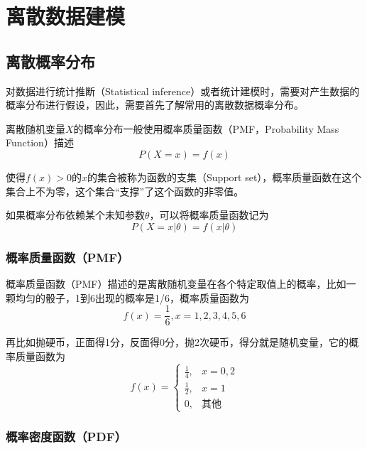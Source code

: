\section{离散数据建模}

\subsection{离散概率分布}

对数据进行统计推断（Statistical inference）或者统计建模时，需要对产生数据的概率分布进行假设，因此，需要首先了解常用的离散数据概率分布。

离散随机变量$X$的概率分布一般使用概率质量函数（PMF，Probability Mass Function）描述
\begin{equation}
    P(X = x) = f(x)
\end{equation}

使得$f(x)>0$的$x$的集合被称为函数的支集（Support set），概率质量函数在这个集合上不为零，这个集合“支撑”了这个函数的非零值。

如果概率分布依赖某个未知参数$\theta$，可以将概率质量函数记为
\begin{equation}
    P(X = x | \theta) = f(x | \theta)
\end{equation}

\subsubsection{概率质量函数（PMF）}

概率质量函数（PMF）描述的是离散随机变量在各个特定取值上的概率，比如一颗均匀的骰子，1到6出现的概率是1/6，概率质量函数为
\begin{equation}
    f(x) = \frac{1}{6}, x = 1,2,3,4,5,6
\end{equation}

再比如抛硬币，正面得1分，反面得0分，抛2次硬币，得分就是随机变量，它的概率质量函数为
\begin{equation}
    f(x) = \begin{cases}
        \frac{1}{4}, & x = 0,2   \\
        \frac{1}{2}, & x = 1     \\
        0,           & \text{其他}
    \end{cases}
\end{equation}

\subsubsection{概率密度函数（PDF）}

